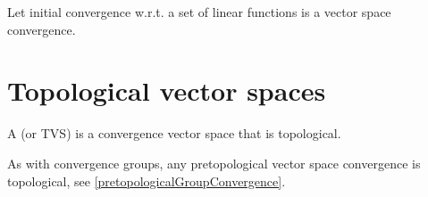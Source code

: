 \begin{proposition} \label{initialVectorConvergenceLinearFunctions}
Let initial convergence w.r.t. a set of linear functions is a vector space convergence.
\end{proposition}

\section{Topological vector spaces}
\begin{definition}
A  (or TVS) is a convergence vector space that is topological.
\end{definition}
As with convergence groups, any pretopological vector space convergence is topological, see \ref{pretopologicalGroupConvergence}.

